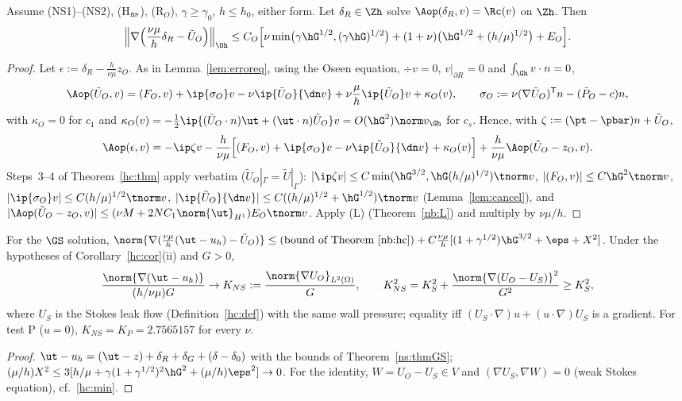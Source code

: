\begin{theorem}\label{nb:hc}
Assume (NS1)--(NS2), (H$_{\rm ns}$), (R$_O$), $\gamma\ge\gamma_0$, $h\le h_0$, either form. Let $\delta_R\in\Zh$ solve $\Aop(\delta_R,v)=\Rc(v)$ on $\Zh$. Then
\[
\Bigl\|\nabla\Bigl(\frac{\nu\mu}h\delta_R-\tilde U_O\Bigr)\Bigr\|_{\Oh}\le C_O\Bigl[\nu\min\bigl(\gamma\hG^{1/2},(\gamma\hG)^{1/2}\bigr)+(1+\nu)\bigl(\hG^{1/2}+(h/\mu)^{1/2}\bigr)+E_O\Bigr].
\]
\end{theorem}
\begin{proof}
Let $\epsilon:=\delta_R-\frac h{\nu\mu}z_O$. As in Lemma~\ref{lem:erroreq}, using the Oseen equation, $\div v=0$, $v|_{\partial R}=0$ and $\int_{\Gh}v\cdot n=0$,
\[
\Aop(\tilde U_O,v)=(F_O,v)+\ip{\sigma_O}v-\nu\ip{\tilde U_O}{\dn v}+\nu\frac\mu h\ip{\tilde U_O}v+\kappa_O(v),\qquad \sigma_O:=\nu(\nabla\tilde U_O)^{\mathsf T}n-(\tilde P_O-c)n,
\]
with $\kappa_O=0$ for $c_1$ and $\kappa_O(v)=-\frac12\ip{(\tilde U_O\cdot n)\ut+(\ut\cdot n)\tilde U_O}v=O(\hG^2)\norm v_{\Gh}$ for $c_s$. Hence, with $\zeta:=(\pt-\pbar)n+\tilde U_O$,
\[
\Aop(\epsilon,v)=-\ip\zeta v-\frac h{\nu\mu}\Bigl[(F_O,v)+\ip{\sigma_O}v-\nu\ip{\tilde U_O}{\dn v}+\kappa_O(v)\Bigr]+\frac h{\nu\mu}\Aop(\tilde U_O-z_O,v).
\]
Steps~3--4 of Theorem~\ref{hc:thm} apply verbatim ($\tilde U_O|_\Gamma=\tilde U|_\Gamma$): $|\ip\zeta v|\le C\min(\hG^{3/2},\hG(h/\mu)^{1/2})\tnorm v$, $|(F_O,v)|\le C\hG^2\tnorm v$,
$|\ip{\sigma_O}v|\le C(h/\mu)^{1/2}\tnorm v$, $|\ip{\tilde U_O}{\dn v}|\le C((h/\mu)^{1/2}+\hG^{1/2})\tnorm v$ (Lemma~\ref{lem:cancel}), and
$|\Aop(\tilde U_O-z_O,v)|\le(\nu M+2NC_1\norm{\ut}_{H^1})E_O\tnorm v$. Apply (L) (Theorem~\ref{nb:L}) and multiply by $\nu\mu/h$.
\end{proof}

\begin{corollary}\label{nb:KNS}
For the $\GS$ solution, $\norm{\nabla(\frac{\nu\mu}h(\ut-u_h)-\tilde U_O)}\le(\text{bound of Theorem~\ref{nb:hc}})+C\frac{\nu\mu}h[(1+\gamma^{1/2})\hG^{3/2}+\eps+X^2]$.
Under the hypotheses of Corollary~\ref{hc:cor}(ii) and $G>0$,
\[
\frac{\norm{\nabla(\ut-u_h)}}{(h/\nu\mu)G}\to K_{NS}:=\frac{\norm{\nabla U_O}_{L^2(\Omega)}}G,\qquad K_{NS}^2=K_S^2+\frac{\norm{\nabla(U_O-U_S)}^2}{G^2}\ge K_S^2,
\]
where $U_S$ is the Stokes leak flow (Definition~\ref{hc:def}) with the same wall pressure; equality iff $(U_S\cdot\nabla)u+(u\cdot\nabla)U_S$ is a gradient. For test P ($u=0$), $K_{NS}=K_P=2.7565157$ for every $\nu$.
\end{corollary}
\begin{proof}
$\ut-u_h=(\ut-z)+\delta_R+\delta_G+(\delta-\delta_0)$ with the bounds of Theorem~\ref{ns:thmGS}; $(\mu/h)X^2\le3[h/\mu+\gamma(1+\gamma^{1/2})^2\hG^2+(\mu/h)\eps^2]\to0$.
For the identity, $W=U_O-U_S\in V$ and $(\nabla U_S,\nabla W)=0$ (weak Stokes equation), cf.\ \eqref{hc:min}.
\end{proof}

